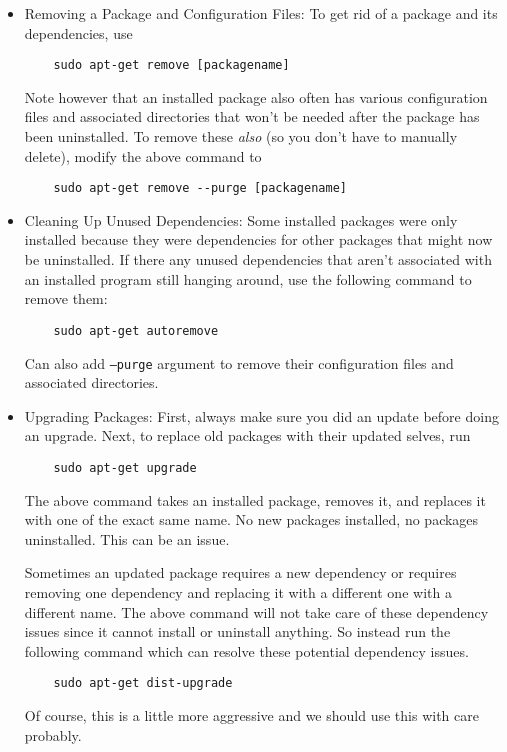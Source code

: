 \documentclass[12pt]{article}
\theoremstyle{plain}
\theoremstyle{definition}
\theoremstyle{remark}
\begin{document}
\begin{itemize}
  \item Removing a Package and Configuration Files:
    To get rid of a package and its dependencies, use
    \begin{lstlisting}
    sudo apt-get remove [packagename]
    \end{lstlisting}
    Note however that an installed package also often has various
    configuration files and associated directories that won't be needed
    after the package has been uninstalled.
    To remove these \emph{also} (so you don't have to manually delete),
    modify the above command to
    \begin{lstlisting}
    sudo apt-get remove --purge [packagename]
    \end{lstlisting}

  \item Cleaning Up Unused Dependencies:
    Some installed packages were only installed because they were
    dependencies for other packages that might now be uninstalled.
    If there any unused dependencies that aren't associated with an
    installed program still hanging around, use the following command to
    remove them:
    \begin{lstlisting}
    sudo apt-get autoremove
    \end{lstlisting}
    Can also add \texttt{--purge} argument to remove their configuration
    files and associated directories.

  \item Upgrading Packages:
    First, always make sure you did an update before doing an upgrade.
    Next, to replace old packages with their updated selves, run
    \begin{lstlisting}
    sudo apt-get upgrade
    \end{lstlisting}
    The above command takes an installed package, removes it, and
    replaces it with one of the exact same name.
    No new packages installed, no packages uninstalled.
    This can be an issue.

    Sometimes an updated package requires a new dependency or requires
    removing one dependency and replacing it with a different one with a
    different name.
    The above command will not take care of these dependency issues
    since it cannot install or uninstall anything.
    So instead run the following command which can resolve these
    potential dependency issues.
    \begin{lstlisting}
    sudo apt-get dist-upgrade
    \end{lstlisting}
    Of course, this is a little more aggressive and we should use this
    with care probably.


\end{itemize}
\end{document}
